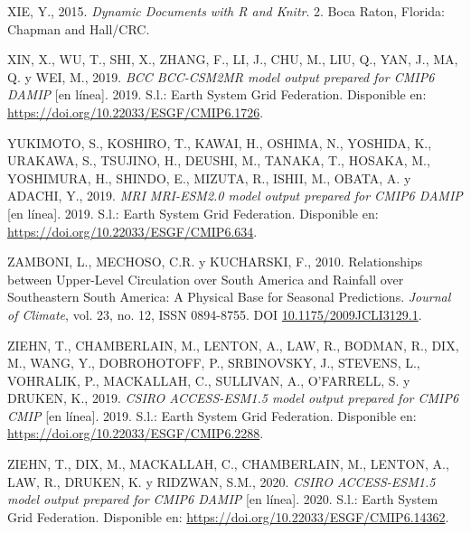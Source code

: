 \documentclass[12pt,oneside,a4paper]{reedthesis}
\newlength{\cslhangindent}
\newenvironment{CSLReferences}[2] %
 {%
  \setlength{\parindent}{0pt}
  \ifodd #1 \everypar{\setlength{\hangindent}{\cslhangindent}}\ignorespaces\fi
  \ifnum #2 > 0
  \setlength{\parskip}{#2\baselineskip}
  \fi
 }%
 {}
\begin{document}
\begin{CSLReferences}{1}{0}
\leavevmode{}%
XIE, Y., 2015. \emph{Dynamic Documents with {R} and Knitr}. 2. {Boca Raton, Florida}: {Chapman and Hall/CRC}.

\leavevmode{}%
XIN, X., WU, T., SHI, X., ZHANG, F., LI, J., CHU, M., LIU, Q., YAN, J., MA, Q. y WEI, M., 2019. \emph{BCC BCC-CSM2MR model output prepared for CMIP6 DAMIP} {[}en línea{]}. 2019. S.l.: Earth System Grid Federation. Disponible en: \url{https://doi.org/10.22033/ESGF/CMIP6.1726}.

\leavevmode{}%
YUKIMOTO, S., KOSHIRO, T., KAWAI, H., OSHIMA, N., YOSHIDA, K., URAKAWA, S., TSUJINO, H., DEUSHI, M., TANAKA, T., HOSAKA, M., YOSHIMURA, H., SHINDO, E., MIZUTA, R., ISHII, M., OBATA, A. y ADACHI, Y., 2019. \emph{MRI MRI-ESM2.0 model output prepared for CMIP6 DAMIP} {[}en línea{]}. 2019. S.l.: Earth System Grid Federation. Disponible en: \url{https://doi.org/10.22033/ESGF/CMIP6.634}.

\leavevmode{}%
ZAMBONI, L., MECHOSO, C.R. y KUCHARSKI, F., 2010. Relationships between {Upper-Level Circulation} over {South America} and {Rainfall} over {Southeastern South America}: {A Physical Base} for {Seasonal Predictions}. \emph{Journal of Climate}, vol. 23, no. 12, ISSN 0894-8755. DOI \href{https://doi.org/10.1175/2009JCLI3129.1}{10.1175/2009JCLI3129.1}.

\leavevmode{}%
ZIEHN, T., CHAMBERLAIN, M., LENTON, A., LAW, R., BODMAN, R., DIX, M., WANG, Y., DOBROHOTOFF, P., SRBINOVSKY, J., STEVENS, L., VOHRALIK, P., MACKALLAH, C., SULLIVAN, A., O'FARRELL, S. y DRUKEN, K., 2019. \emph{CSIRO ACCESS-ESM1.5 model output prepared for CMIP6 CMIP} {[}en línea{]}. 2019. S.l.: Earth System Grid Federation. Disponible en: \url{https://doi.org/10.22033/ESGF/CMIP6.2288}.

\leavevmode{}%
ZIEHN, T., DIX, M., MACKALLAH, C., CHAMBERLAIN, M., LENTON, A., LAW, R., DRUKEN, K. y RIDZWAN, S.M., 2020. \emph{CSIRO ACCESS-ESM1.5 model output prepared for CMIP6 DAMIP} {[}en línea{]}. 2020. S.l.: Earth System Grid Federation. Disponible en: \url{https://doi.org/10.22033/ESGF/CMIP6.14362}.

\end{CSLReferences}


\end{document}
